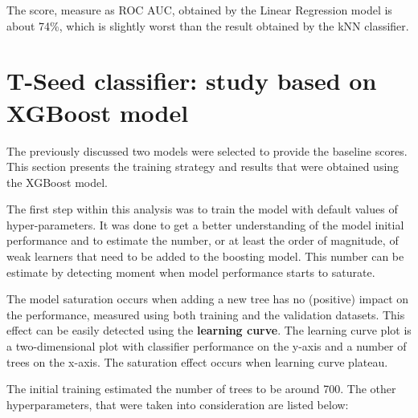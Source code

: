 The score, measure as ROC AUC, obtained by the Linear Regression model is about 74\%, which is slightly worst than the result obtained by the kNN classifier.  

\section{T-Seed classifier: study based on XGBoost model}

The previously discussed two models were selected to provide the baseline scores. This section presents the training strategy and results that were obtained using the XGBoost model. 

The first step within this analysis was to train the model with default values of hyper-parameters. It was done to get a better understanding of the model initial performance and to estimate the number, or at least the order of magnitude, of weak learners that need to be added to the boosting model. This number can be estimate by detecting moment when model performance starts to saturate. 

The model saturation occurs when adding a new tree has no (positive) impact on the performance, measured using both training and the validation datasets. This effect can be easily detected using the \textbf{learning curve}. The learning curve plot is a two-dimensional plot with classifier performance on the y-axis and a number of trees on the x-axis. The saturation effect occurs when learning curve plateau. 

The initial training estimated the number of trees to be around 700. The other hyperparameters, that were taken into consideration are listed below:


